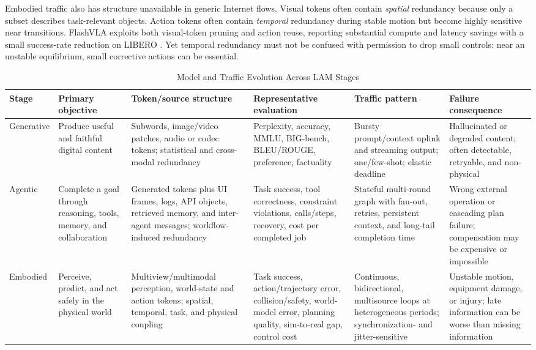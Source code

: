 \documentclass[letterpaper,journal]{IEEEtran}
\begin{document}
Embodied traffic also has structure unavailable in generic Internet flows.
Visual tokens often contain \emph{spatial} redundancy because only a subset
describes task-relevant objects. Action tokens often contain \emph{temporal}
redundancy during stable motion but become highly sensitive near transitions.
FlashVLA exploits both visual-token pruning and action reuse, reporting
substantial compute and latency savings with a small success-rate reduction
on LIBERO \cite{flashvla}. Yet temporal redundancy must not be confused with
permission to drop small controls: near an unstable equilibrium, small
corrective actions can be essential.

\begin{table}[t]
\caption{Model and Traffic Evolution Across LAM Stages}
\label{tab:modeltaxonomy}
\centering
\footnotesize
\renewcommand{\arraystretch}{1.18}
\setlength{\tabcolsep}{3.2pt}
\begin{tabular}{|p{}|p{}|p{}|p{}|p{}|p{}|}
\hline
\textbf{Stage} & \textbf{Primary objective} & \textbf{Token/source structure}
& \textbf{Representative evaluation} & \textbf{Traffic pattern}
& \textbf{Failure consequence} \\ \hline
Generative &
Produce useful and faithful digital content &
Subwords, image/video patches, audio or codec tokens; statistical and
cross-modal redundancy &
Perplexity, accuracy, MMLU, BIG-bench, BLEU/ROUGE, preference, factuality &
Bursty prompt/context uplink and streaming output; one/few-shot; elastic
deadline &
Hallucinated or degraded content; often detectable, retryable, and
non-physical \\ \hline
Agentic &
Complete a goal through reasoning, tools, memory, and collaboration &
Generated tokens plus UI frames, logs, API objects, retrieved memory, and
inter-agent messages; workflow-induced redundancy &
Task success, tool correctness, constraint violations, calls/steps, recovery,
cost per completed job &
Stateful multi-round graph with fan-out, retries, persistent context, and
long-tail completion time &
Wrong external operation or cascading plan failure; compensation may be
expensive or impossible \\ \hline
Embodied &
Perceive, predict, and act safely in the physical world &
Multiview/multimodal perception, world-state and action tokens; spatial,
temporal, task, and physical coupling &
Task success, action/trajectory error, collision/safety, world-model error,
planning quality, sim-to-real gap, control cost &
Continuous, bidirectional, multisource loops at heterogeneous periods;
synchronization- and jitter-sensitive &
Unstable motion, equipment damage, or injury; late information can be worse
than missing information \\ \hline
\end{tabular}
\end{table}
\end{document}
